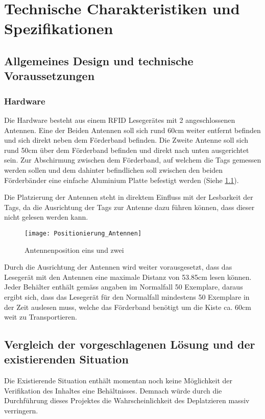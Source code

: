 \chapter{Technische Charakteristiken und Spezifikationen}

\section{Allgemeines Design und technische Voraussetzungen}
\subsection{Hardware}
Die Hardware besteht aus einem RFID Lesegerätes mit 2 angeschlossenen Antennen. Eine der Beiden Antennen soll sich rund 60cm weiter entfernt befinden und sich direkt neben dem Förderband befinden. Die Zweite Antenne soll sich rund 50cm über dem Förderband befinden und direkt nach unten ausgerichtet sein. Zur Abschirmung zwischen dem Förderband, auf welchem die Tags gemessen werden sollen und dem dahinter befindlichen soll zwischen den beiden Förderbänder eine einfache Aluminium Platte befestigt werden (Siehe \ref{fig:positionAntennen}).

Die Platzierung der Antennen steht in direktem Einfluss mit der Lesbarkeit der Tags, da die Ausrichtung der Tags zur Antenne dazu führen können, dass dieser nicht gelesen werden kann.

\begin{figure}
	\centering
	\texttt{[image: Positionierung\_Antennen]}
	\caption{Antennenposition eins und zwei}
	\label{fig:positionAntennen}
\end{figure}


Durch die Ausrichtung der Antennen wird weiter vorausgesetzt, dass das Lesegerät mit den Antennen eine maximale Distanz von 53.85cm lesen können. Jeder Behälter enthält gemäss angaben im Normalfall 50 Exemplare, daraus ergibt sich, dass das Lesegerät für den Normalfall mindestens 50 Exemplare in der Zeit auslesen muss, welche das Förderband benötigt um die Kiste ca. 60cm weit zu Transportieren.

\section{Vergleich der vorgeschlagenen Lösung und der existierenden Situation}
Die Existierende Situation enthält momentan noch keine Möglichkeit der Verifikation des Inhaltes eine Behältnisses. Demnach würde durch die Durchführung dieses Projektes die Wahrscheinlichkeit des Deplatzieren massiv verringern.

